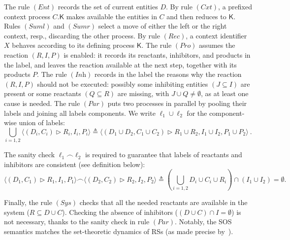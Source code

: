 \documentclass[sn-mathphys-num,a4paper,iicol,lineno,pdflatex]{sn-jnl-hacked}
\newcommand{\obs}[2]{\langle #1\vartriangleright #2\rangle}
\theoremstyle{thmstyleone}%
\theoremstyle{thmstyletwo}%
\theoremstyle{thmstylethree}%
\begin{document}
The rule $(\textit{Ent})$ records the set of current entities $D$.
By rule $(\textit{Cxt})$, a prefixed context process $C.\mathsf{K}$ makes available the entities in $C$ and then reduces to $\mathsf{K}$. 
Rules $(\textit{Suml})$ and $(\textit{Sumr})$ select a move of either the left or the right context, resp., discarding the other process.
By rule $(\textit{Rec})$, a context identifier $X$ behaves according to its defining process $\mathsf{K}$.
The rule $(\textit{Pro})$ assumes the reaction $(R,I,P)$ is enabled: it records its reactants, inhibitors, and products in the label, and leaves the reaction  available at the next step, together with its products $P$.
The rule $(\textit{Inh})$ records in the label the reasons why the reaction $(R,I,P)$ should not be executed: possibly some inhibiting entities $(J \subseteq I)$ are present or some reactants $(Q \subseteq R)$ are missing, with $J \cup Q \neq \emptyset$, as at least one cause is needed.
The rule $(\textit{Par})$ puts two processes in parallel by pooling their labels and joining all labels components. We write $\ell_1\cup\ell_2$ for the component-wise union of labels:
%
{\footnotesize
\[
\textstyle
\bigcup_{i=1,2} \obs{(D_i,C_i)}{R_i,I_i,P_i}
\triangleq 
\obs{(D_1\cup D_2,C_1\cup C_2)}{R_1\cup R_2,I_1\cup I_2,P_1\cup P_2}\ .
\]}


The sanity check $\ell_1\frown\ell_2$ is required to guarantee that labels of reactants and inhibitors are consistent (see definition below):
%
{\footnotesize
\[
\obs{(D_1,C_1)}{R_1,I_1,P_1}
\frown
\obs{(D_2,C_2)}{R_2,I_2,P_2}
\triangleq
\textstyle (\bigcup_{i=1,2} D_i\cup C_i \cup R_i) \cap (I_1\cup I_2) = \emptyset .
\]
}


Finally, the rule $(\textit{Sys})$ checks that all the needed reactants are available in the system ($R \subseteq D\cup C$). Checking the absence of inhibitors  ($(D\cup C)\cap I = \emptyset$) is not necessary, thanks to the sanity check in rule $(\textit{Par})$.
%
Notably, the SOS semantics matches the set-theoretic dynamics of RSs (as made precise by~\cite[Th.~19]{DBLP:journals/tcs/BrodoBF21}). 
\end{document}
